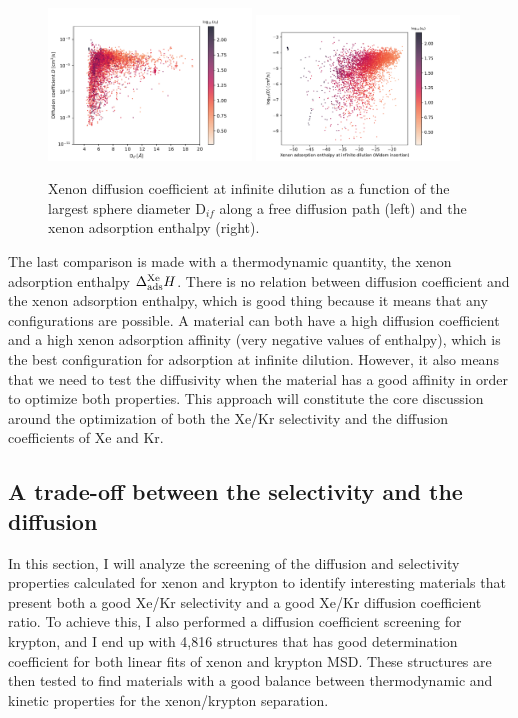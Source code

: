 \documentclass[main]{subfiles}
\begin{document}
\begin{figure}[ht]
  \centering
    \includegraphics[width=0.48\textwidth]{figures/5-diffusion/D_log-lcd_s_+.pdf}
    \includegraphics[width=0.48\textwidth]{figures/5-diffusion/D_log-H_Xe_s_+.pdf}
    \caption{Xenon diffusion coefficient at infinite dilution as a function of the largest sphere diameter D$_{if}$ along a free diffusion path (left) and the xenon adsorption enthalpy (right). }\label{fgr:diff_H_lcd}
\end{figure}

The last comparison is made with a thermodynamic quantity, the xenon adsorption enthalpy $\Delta_{\text{ads}}^{\text{Xe}}H$. There is no relation between diffusion coefficient and the xenon adsorption enthalpy, which is good thing because it means that any configurations are possible. A material can both have a high diffusion coefficient and a high xenon adsorption affinity (very negative values of enthalpy), which is the best configuration for adsorption at infinite dilution. However, it also means that we need to test the diffusivity when the material has a good affinity in order to optimize both properties. This approach will constitute the core discussion around the optimization of both the Xe/Kr selectivity and the diffusion coefficients of Xe and Kr.  

\subsection{A trade-off between the selectivity and the diffusion}

In this section, I will analyze the screening of the diffusion and selectivity properties calculated for xenon and krypton to identify interesting materials that present both a good Xe/Kr selectivity and a good Xe/Kr diffusion coefficient ratio. To achieve this, I also performed a diffusion coefficient screening for krypton, and I end up with 4,816 structures that has good determination coefficient for both linear fits of xenon and krypton MSD. These structures are then tested to find materials with a good balance between thermodynamic and kinetic properties for the xenon/krypton separation.
\end{document}
